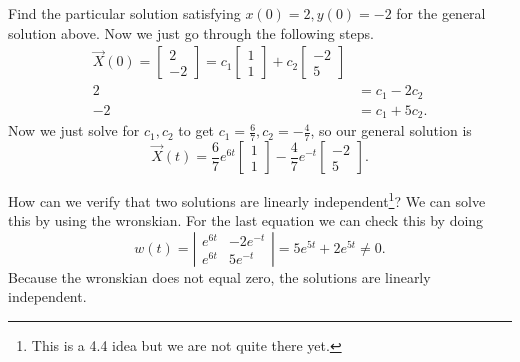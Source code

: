 \begin{eg}
  Find the particular solution satisfying $x(0)=2,y(0)=-2$ for the general solution above. Now we just go through the following steps.
  \begin{align*}
    \vec{X}(0)=\begin{bmatrix} 2\\-2 \end{bmatrix} =c_1\begin{bmatrix} 1\\1 \end{bmatrix} +c_2\begin{bmatrix} -2\\5 \end{bmatrix} \\
    2&=c_1-2c_2\\
    -2&=c_1+5c_2
  .\end{align*}
  Now we just solve for $c_1,c_2$ to get $c_1=\frac{6}{7},c_2=-\frac{4}{7}$, so our general solution is \[
    \vec{X}(t)=\frac{6}{7}e^{6t}\begin{bmatrix} 1\\1 \end{bmatrix} -\frac{4}{7}e^{-t}\begin{bmatrix} -2\\5 \end{bmatrix} 
  .\] 
\end{eg}

How can we verify that two solutions are linearly independent\footnote{This is a 4.4 idea but we are not quite there yet.}? We can solve this by using the wronskian. For the last equation we can check this by doing \[
  w(t)=\left| \begin{matrix} e^{6t}&-2e^{-t}\\e^{6t}&5e^{-t} \end{matrix} \right| = 5e^{5t}+2e^{5t}\neq 0 
.\] Because the wronskian does not equal zero, the solutions are linearly independent.\newline 

